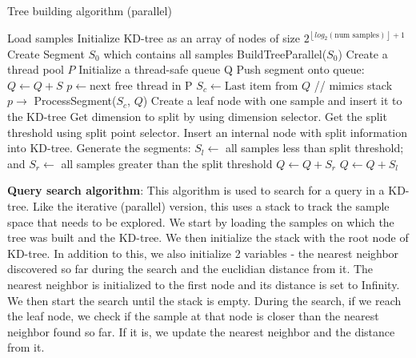 \documentclass[11pt]{amsart}
\begin{document}
\begin{list}{}{\leftmargin= 1.4cm}
\begin{algorithm}[!t]
\caption{Tree building algorithm (parallel)}
\label{tree_building_parallel}
\begin{algorithmic}[1]
\State Load samples
\State Initialize KD-tree as an array of nodes of size $2^{\left \lfloor{log_{2}(\text{num samples})}\right \rfloor + 1 }$ 
\State Create Segment $S_0$ which contains all samples
\State 
\State BuildTreeParallel($S_0$)
\State
{}
\State Create a thread pool $P$
\State Initialize a thread-safe queue Q
\State Push segment onto queue: $Q \gets Q + S$
\State $p \gets \text{next free thread in P}$
\State $S_c \gets \text{Last item from } Q$ \hspace{0.5in}// mimics stack
\State $p \rightarrow$  ProcessSegment($S_c$, $Q$)
\EndWhile
\EndProcedure
\State
{}
\State Create a leaf node with one sample and insert it to the KD-tree
\Else
\State Get dimension to split by using dimension selector.
\State Get the split threshold using split point selector.
\State Insert an internal node with split information into KD-tree.
\State
\State Generate the segments:
\State $S_l \gets $ all samples less than split threshold; and
\State $S_r \gets $  all samples greater than the split threshold
\State
\State $Q \gets Q + S_r$
\State $Q \gets Q + S_l$
\EndIf
\EndProcedure
\State 
\end{algorithmic}
\end{algorithm}

\item\textbf{Query search algorithm}: This algorithm is used to search for a query in a KD-tree. Like the iterative (parallel) version, this uses a stack to track the sample space that needs to be explored. We start by loading the samples on which the tree was built and the KD-tree. We then initialize the stack with the root node of KD-tree. In addition to this, we also initialize 2 variables - the nearest neighbor discovered so far during the search and the euclidian distance from it. The nearest neighbor is initialized to the first node and its distance is set to Infinity. We then start the search until the stack is empty. During the search, if we reach the leaf node, we check if the sample at that node is closer than the nearest neighbor found so far. If it is, we update the nearest neighbor and the distance from it.


\end{list}
\end{document}
